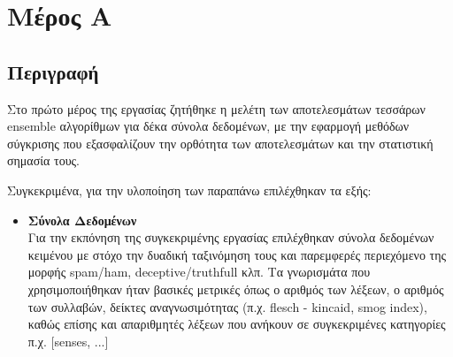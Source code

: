 \section{Μέρος Α}
\subsection{Περιγραφή}
Στο πρώτο μέρος της εργασίας ζητήθηκε η μελέτη των αποτελεσμάτων τεσσάρων
ensemble αλγορίθμων για δέκα σύνολα δεδομένων, με την εφαρμογή μεθόδων 
σύγκρισης που εξασφαλίζουν την ορθότητα των αποτελεσμάτων και την στατιστική
σημασία τους. 

Συγκεκριμένα, για την υλοποίηση των παραπάνω επιλέχθηκαν τα εξής:

\begin{itemize}
	\item \textbf{Σύνολα Δεδομένων} \\
	Για την εκπόνηση της συγκεκριμένης εργασίας επιλέχθηκαν σύνολα δεδομένων κειμένου
	με στόχο την δυαδική ταξινόμηση τους και παρεμφερές περιεχόμενο της μορφής spam/ham, 
	deceptive/truthfull κλπ. Τα γνωρισμάτα που χρησιμοποιήθηκαν ήταν βασικές μετρικές 
	όπως ο αριθμός των λέξεων, ο αριθμός των συλλαβών, δείκτες αναγνωσιμότητας 
	(π.χ. flesch - kincaid, smog index), καθώς επίσης και απαριθμητές λέξεων που 
	ανήκουν σε συγκεκριμένες κατηγορίες π.χ. [senses, ...]
	

\end{itemize}
